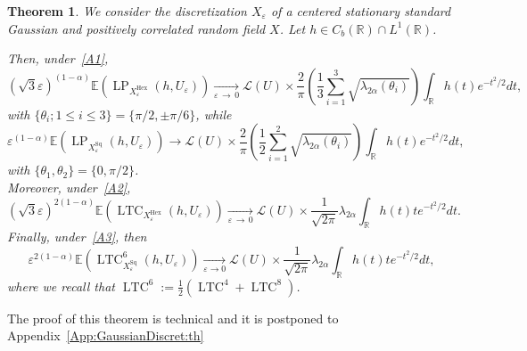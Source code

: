 \documentclass[10pt]{amsart}
\newtheorem{theo}{Theorem}[section]
\theoremstyle{definition}\newtheorem{defi}[theo]{Definition}\newtheorem{rema}[theo]{Remark}\newtheorem{exam}[theo]{Example}\newtheorem{exem}[theo]{Example}\newtheorem{nota}[theo]{Notation}
\newcommand{\R}{\mathbb{R}}
\newcommand{\E}{\mathbb{E}}
\newcommand{\eps}{\varepsilon}
\DeclareMathOperator{\LTC}{LTC}
\DeclareMathOperator{\LP}{LP}
\DeclareMathOperator{\Hex}{Hex}
\DeclareMathOperator{\Sq}{Sq}
\newcommand{\calL}{\mathcal{L}}
\begin{document}
\begin{theo}\label{GaussianDiscret:th}
We consider the discretization $X_\eps$ of a centered stationary standard Gaussian and positively correlated random field $X$. Let $h \in C_b(\R)\cap L^1(\R)$.

\noindent Then, under~\eqref{A1},
\[
\left(\sqrt{3}\eps\right)^{(1-\alpha)}\E\left(\LP_{X_\eps^{\Hex}}(h,U_\eps)\right)\underset{\eps\,\rightarrow\,0}{\longrightarrow}{\calL}(U)\times \frac{2}{{\pi}}
\left(\frac{1}{3}\sum_{i=1}^3\sqrt{{\lambda_{{2\alpha}}(\theta_i)}}\right)\int_{\R}h(t)e^{-t^2/2}dt,
\]
with $\{\theta_i;1\le i\le 3\}=\{\pi/2,\pm\pi/6\}$, while
\[
\eps^{(1-\alpha)}\E\left(\LP_{X_\eps^{\Sq}}(h,U_\eps)\right)\longrightarrow
{\calL}(U)\times \frac{2}{{\pi}} \left(\frac{1}{2}\sum_{i=1}^2\sqrt{{\lambda_{{2\alpha}}(\theta_i)}}\right)\int_{\R}h(t)e^{-t^2/2}dt,
\]
with $\{\theta_1,\theta_2\}=\{0,\pi/2\}$.\\
Moreover, under~\eqref{A2},
\[
\left(\sqrt{3}\eps\right)^{2(1-\alpha)}\E\left(\LTC_{X_\eps^{\Hex}}(h,U_\eps)\right)\underset{\eps\,\rightarrow\,0}{\longrightarrow} {\calL}(U)\times\frac{1}{\sqrt{2\pi}}\lambda_{{2\alpha}}\int_{\R}h(t)te^{-t^2/2}dt.
\]
Finally, under~\eqref{A3}, then
\[
\eps^{2(1-\alpha)}\E\left(\LTC^6_{X_\eps^{\Sq}}(h,U_\eps)\right)\underset{\eps\rightarrow 0}{\longrightarrow} {\calL}(U)\times
\frac{1}{\sqrt{2\pi}}\lambda_{{2\alpha}}\int_{\R}h(t)te^{-t^2/2}dt,
\]
where we recall that $\LTC^6:=\frac{1}{2}(\LTC^4+ \LTC^8)$.
\end{theo}

The proof of this theorem is technical and it is postponed to Appendix~\ref{App:GaussianDiscret:th}
\end{document}
